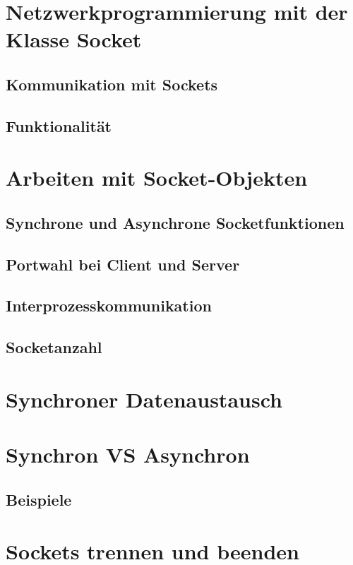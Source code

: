 \section{Netzwerkprogrammierung mit der Klasse Socket}
\subsection{Kommunikation mit Sockets}
\subsection{Funktionalität}

\section{Arbeiten mit Socket-Objekten}
\subsection{Synchrone und Asynchrone Socketfunktionen}
\subsection{Portwahl bei Client und Server}
\subsection{Interprozesskommunikation}
\subsection{Socketanzahl}

\section{Synchroner Datenaustausch}
\section{Synchron VS Asynchron}
\subsection{Beispiele}

\section{Sockets trennen und beenden}








